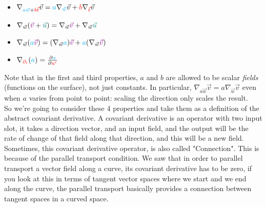 \begin{itemize}
    \item $\nabla_{\begingroup\color{cyan}a\vec{w}\endgroup + \begingroup\color{red}b\vec{t}\endgroup}\vec{v} = \begingroup\color{cyan}a\endgroup \nabla_{\begingroup\color{cyan}\vec{w}\endgroup}\vec{v} + \begingroup\color{red}b\endgroup \nabla_{\begingroup\color{red}\vec{t}\endgroup}\vec{v}$
    \item $\nabla_{\vec{w}}(\begingroup\color{violet}\vec{v}\endgroup + \begingroup\color{teal}\vec{u}\endgroup) = \nabla_{\vec{w}}\begingroup\color{violet}\vec{v}\endgroup + \nabla_{\vec{w}}\begingroup\color{teal}\vec{u}\endgroup$
    \item $\nabla_{\vec{w}}(\begingroup\color{cyan}a\endgroup \begingroup\color{violet}\vec{v}\endgroup) = (\nabla_{\vec{w}} \begingroup\color{cyan}a\endgroup) \begingroup\color{violet}\vec{v}\endgroup + \begingroup\color{cyan}a\endgroup (\nabla_{\vec{w}}\begingroup\color{violet}\vec{v}\endgroup)$
    \item $\nabla_{\begingroup\color{red}\partial_i\endgroup} (\begingroup\color{cyan}a\endgroup) = \frac{\partial \begingroup\color{cyan}a\endgroup}{\partial \begingroup\color{red}u^i\endgroup}$
\end{itemize}

Note that in the first and third properties, $a$ and $b$ are allowed to be scalar \textit{fields} (functions on the surface), not just constants.
In particular, $\nabla_{a\vec{w}}\vec{v} = a\nabla_{\vec{w}}\vec{v}$ even when $a$ varies from point to point: scaling the direction only scales the result.\\

So we're going to consider these 4 properties and take them as a definition of the abstract covariant derivative.
A covariant derivative is an operator with two input slot, it takes a direction vector, and an input field, and the output
will be the rate of change of that field along that direction, and this will be a new field.\\

Sometimes, this covariant derivative operator, is also called "Connection". This is because of the parallel transport condition. We saw
that in order to parallel transport a vector field along a curve, its covariant derivative has to be zero, if you look at this in terms of 
tangent vector spaces where we start and we end along the curve, the parallel transport basically provides a connection between tangent spaces in a curved space.\\

